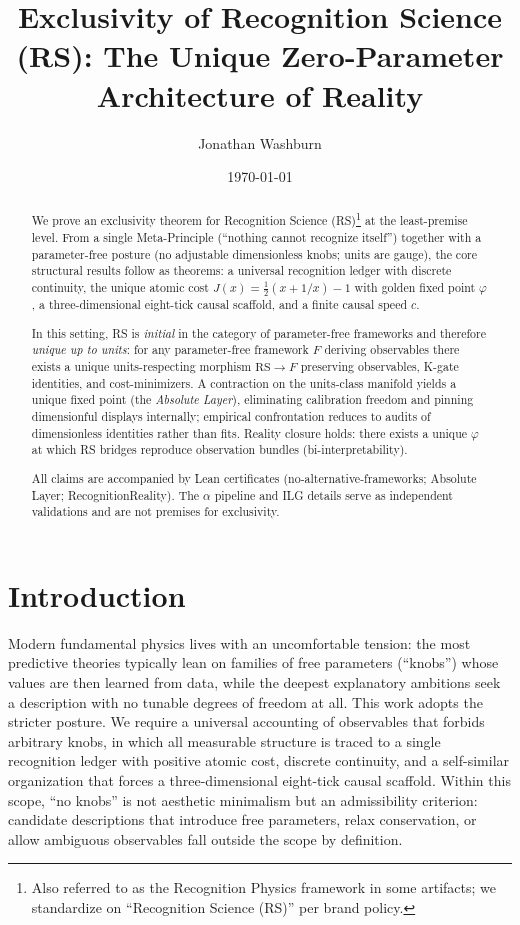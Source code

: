 \documentclass[11pt]{article}
\title{Exclusivity of Recognition Science (RS): The Unique Zero\mbox{-}Parameter Architecture of Reality}
\author{Jonathan Washburn}
\date{\today}
\begin{document}
\maketitle

\begin{abstract}
We prove an exclusivity theorem for Recognition Science (RS)\footnote{Also referred to as the Recognition Physics framework in some artifacts; we standardize on “Recognition Science (RS)” per brand policy.} at the least\mbox{-}premise level. From a single Meta\mbox{-}Principle (``nothing cannot recognize itself'') together with a parameter\mbox{-}free posture (no adjustable dimensionless knobs; units are gauge), the core structural results follow as theorems: a universal recognition ledger with discrete continuity, the unique atomic cost \(J(x)=\tfrac{1}{2}(x+1/x)-1\) with golden fixed point \(\varphi\), a three\mbox{-}dimensional eight\mbox{-}tick causal scaffold, and a finite causal speed \(c\).

In this setting, RS is \emph{initial} in the category of parameter\mbox{-}free frameworks and therefore \emph{unique up to units}: for any parameter\mbox{-}free framework \(F\) deriving observables there exists a unique units\mbox{-}respecting morphism \(\mathrm{RS}\to F\) preserving observables, K\mbox{-}gate identities, and cost\mbox{-}minimizers. A contraction on the units\mbox{-}class manifold yields a unique fixed point (the \emph{Absolute Layer}), eliminating calibration freedom and pinning dimensionful displays internally; empirical confrontation reduces to audits of dimensionless identities rather than fits. Reality closure holds: there exists a unique \(\varphi\) at which RS bridges reproduce observation bundles (bi\mbox{-}interpretability).

All claims are accompanied by Lean certificates (no\mbox{-}alternative\mbox{-}frameworks; Absolute Layer; RecognitionReality). The \(\alpha\) pipeline and ILG details serve as independent validations and are not premises for exclusivity.
\end{abstract}

\section{Introduction}
Modern fundamental physics lives with an uncomfortable tension: the most predictive theories typically lean on families of free parameters (``knobs'') whose values are then learned from data, while the deepest explanatory ambitions seek a description with no tunable degrees of freedom at all. This work adopts the stricter posture. We require a universal accounting of observables that forbids arbitrary knobs, in which all measurable structure is traced to a single recognition ledger with positive atomic cost, discrete continuity, and a self\mbox{-}similar organization that forces a three\mbox{-}dimensional eight\mbox{-}tick causal scaffold. Within this scope, ``no knobs'' is not aesthetic minimalism but an admissibility criterion: candidate descriptions that introduce free parameters, relax conservation, or allow ambiguous observables fall outside the scope by definition.
\end{document}
